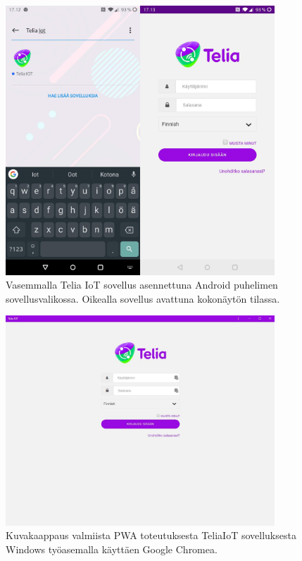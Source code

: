 \documentclass{tktltiki}
\begin{document}
\begin{figure}[!ht]
  \centering
    \includegraphics[width=0.9\textwidth]{teliaiot_puhelimessa.jpg}
      \caption{Vasemmalla Telia IoT sovellus asennettuna Android puhelimen sovellusvalikossa. Oikealla sovellus avattuna kokonäytön tilassa.}
      \label{teliaiot_puhelimessa_asennettuna}
\end{figure}

\begin{figure}[!ht]
  \centering
      \includegraphics[width=0.9\textwidth]{teliaiot_desktop_installation.jpg}
  \caption{Kuvakaappaus valmiista PWA toteutuksesta TeliaIoT sovelluksesta Windows työasemalla käyttäen Google Chromea.}
  \label{teliaiot_windowsissa_asennettuna}
\end{figure}
\end{document}
